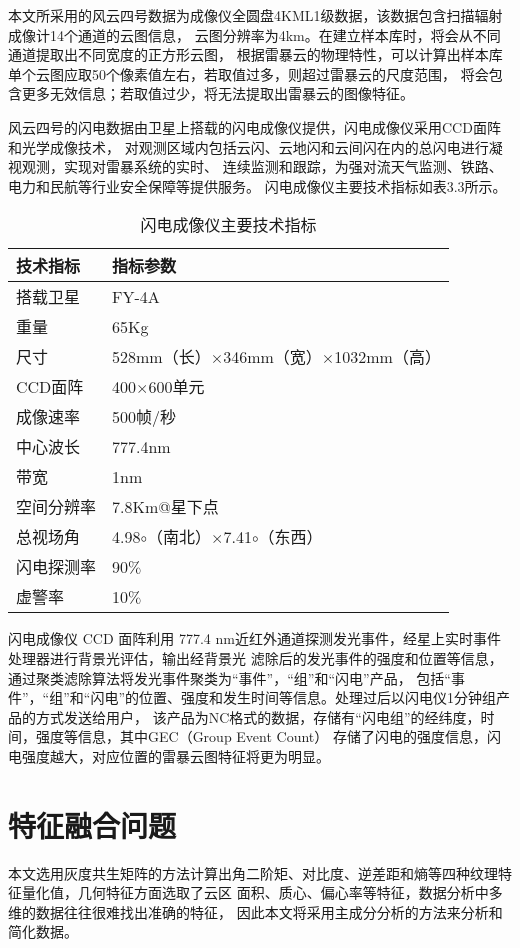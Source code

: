 本文所采用的风云四号数据为成像仪全圆盘4KML1级数据，该数据包含扫描辐射成像计14个通道的云图信息，
云图分辨率为4km。在建立样本库时，将会从不同通道提取出不同宽度的正方形云图，
根据雷暴云的物理特性，可以计算出样本库单个云图应取50个像素值左右，若取值过多，则超过雷暴云的尺度范围，
将会包含更多无效信息；若取值过少，将无法提取出雷暴云的图像特征。

风云四号的闪电数据由卫星上搭载的闪电成像仪提供，闪电成像仪采用CCD面阵和光学成像技术，
对观测区域内包括云闪、云地闪和云间闪在内的总闪电进行凝视观测，实现对雷暴系统的实时、
连续监测和跟踪，为强对流天气监测、铁路、电力和民航等行业安全保障等提供服务\cite{fengyunsihao}。
闪电成像仪主要技术指标如表3.3所示。

\begin{table}[htb]
    \centering\small
    \caption{闪电成像仪主要技术指标}
    \label{tab:exampletable}
    \begin{tabular}{ll}
      \toprule
        技术指标   & 指标参数     \\
      \midrule
      搭载卫星 & FY-4A \\
      重量 & 65Kg   \\
      尺寸 &  528mm（长）$\times$346mm（宽）$\times$1032mm（高）\\
      CCD面阵 &  400$\times$600单元\\
      成像速率 & 500帧/秒  \\
      中心波长 & 777.4nm \\
      带宽 & 1nm \\
      空间分辨率 & 7.8Km@星下点 \\
      总视场角 & 4.98$\circ$（南北）$\times$7.41$\circ$（东西）\\
      闪电探测率 & 90$\%$  \\
      虚警率 & 10$\%$ \\
      \bottomrule
    \end{tabular}
  \end{table}

闪电成像仪 CCD 面阵利用 777.4 nm近红外通道探测发光事件，经星上实时事件处理器进行背景光评估，输出经背景光
滤除后的发光事件的强度和位置等信息，通过聚类滤除算法将发光事件聚类为“事件”，“组”和“闪电”产品，
包括“事件”，“组”和“闪电”的位置、强度和发生时间等信息。处理过后以闪电仪1分钟组产品的方式发送给用户，
该产品为NC格式的数据，存储有“闪电组”的经纬度，时间，强度等信息，其中GEC（Group Event Count）
存储了闪电的强度信息，闪电强度越大，对应位置的雷暴云图特征将更为明显\cite{lmi}\cite{shandianyi}。


\section{特征融合问题}
本文选用灰度共生矩阵的方法计算出角二阶矩、对比度、逆差距和熵等四种纹理特征量化值，几何特征方面选取了云区
面积、质心、偏心率等特征，数据分析中多维的数据往往很难找出准确的特征，
因此本文将采用主成分分析的方法来分析和简化数据。

